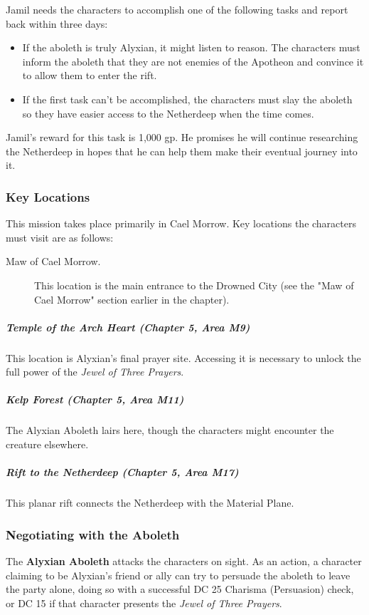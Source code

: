 \documentclass[10pt,a4paper,twoside,bg=print,twocolumn,openany,nodeprecatedcode]{dndbook}
\begin{document}
Jamil needs the characters to accomplish one of the following tasks and report back within three days:


\begin{itemize}
\item If the aboleth is truly Alyxian, it might listen to reason. The characters must inform the aboleth that they are not enemies of the Apotheon and convince it to allow them to enter the rift.
\item If the first task can't be accomplished, the characters must slay the aboleth so they have easier access to the Netherdeep when the time comes.
\end{itemize}

Jamil's reward for this task is 1,000 gp. He promises he will continue researching the Netherdeep in hopes that he can help them make their eventual journey into it.

\subsubsection{Key Locations}
This mission takes place primarily in Cael Morrow. Key locations the characters must visit are as follows:


\begin{description}
\item[Maw of Cael Morrow.]
This location is the main entrance to the Drowned City (see the "Maw of Cael Morrow" section earlier in the chapter).
\end{description}

\subparagraph{Temple of the Arch Heart (Chapter 5, Area M9)}
This location is Alyxian's final prayer site. Accessing it is necessary to unlock the full power of the \textit{Jewel of Three Prayers}.

\subparagraph{Kelp Forest (Chapter 5, Area M11)}
The Alyxian Aboleth lairs here, though the characters might encounter the creature elsewhere.

\subparagraph{Rift to the Netherdeep (Chapter 5, Area M17)}
This planar rift connects the Netherdeep with the Material Plane.

\subsubsection{Negotiating with the Aboleth}
The \textbf{Alyxian Aboleth} attacks the characters on sight. As an action, a character claiming to be Alyxian's friend or ally can try to persuade the aboleth to leave the party alone, doing so with a successful DC 25 Charisma (Persuasion) check, or DC 15 if that character presents the \textit{Jewel of Three Prayers}.
\end{document}
